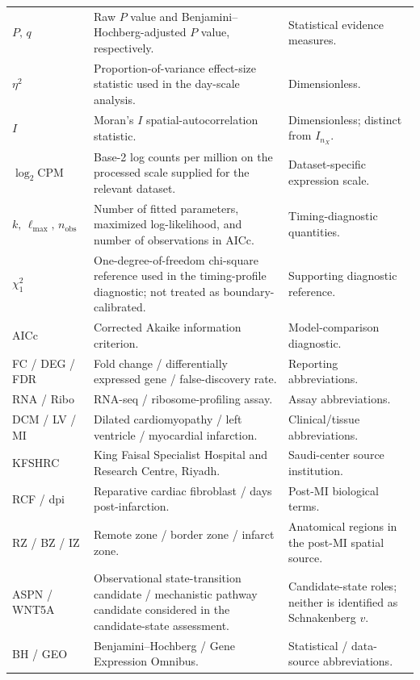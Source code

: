 \documentclass[11pt]{article}
\begin{document}
\begin{longtable}{p{2.4cm}p{8.5cm}p{3.9cm}}
$P,\,q$ & Raw $P$ value and Benjamini--Hochberg-adjusted $P$ value, respectively. & Statistical evidence measures.\\
$\eta^2$ & Proportion-of-variance effect-size statistic used in the day-scale analysis. & Dimensionless.\\
$I$ & Moran's $I$ spatial-autocorrelation statistic. & Dimensionless; distinct from $I_{n_X}$.\\
$\log_2\mathrm{CPM}$ & Base-2 log counts per million on the processed scale supplied for the relevant dataset. & Dataset-specific expression scale.\\
$k,\,\ell_{\max},\,n_{\mathrm{obs}}$ & Number of fitted parameters, maximized log-likelihood, and number of observations in AICc. & Timing-diagnostic quantities.\\
$\chi_1^2$ & One-degree-of-freedom chi-square reference used in the timing-profile diagnostic; not treated as boundary-calibrated. & Supporting diagnostic reference.\\
AICc & Corrected Akaike information criterion. & Model-comparison diagnostic.\\
FC / DEG / FDR & Fold change / differentially expressed gene / false-discovery rate. & Reporting abbreviations.\\
RNA / Ribo & RNA-seq / ribosome-profiling assay. & Assay abbreviations.\\
DCM / LV / MI & Dilated cardiomyopathy / left ventricle / myocardial infarction. & Clinical/tissue abbreviations.\\
KFSHRC & King Faisal Specialist Hospital and Research Centre, Riyadh. & Saudi-center source institution.\\
RCF / dpi & Reparative cardiac fibroblast / days post-infarction. & Post-MI biological terms.\\
RZ / BZ / IZ & Remote zone / border zone / infarct zone. & Anatomical regions in the post-MI spatial source.\\
ASPN / WNT5A & Observational state-transition candidate / mechanistic pathway candidate considered in the candidate-state assessment. & Candidate-state roles; neither is identified as Schnakenberg $v$.\\
BH / GEO & Benjamini--Hochberg / Gene Expression Omnibus. & Statistical / data-source abbreviations.\\
\bottomrule
\end{longtable}
\normalsize
\end{document}
